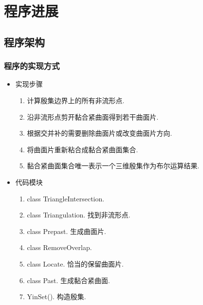 \documentclass[UTF8]{ctexbeamer}	%
\theoremstyle{plain}
\theoremstyle{definition}
\theoremstyle{remark}
\numberwithin{equation}{section}
\begin{document}
\section{程序进展}
\subsection{程序架构}
\begin{frame}
    \frametitle{程序的实现方式}
    \begin{itemize}
        \item 实现步骤
    \begin{enumerate}
        \item 计算殷集边界上的所有非流形点.
        \item 沿非流形点剪开黏合紧曲面得到若干曲面片.
        \item 根据交并补的需要删除曲面片或改变曲面片方向.
        \item 将曲面片重新粘合成黏合紧曲面集合.
        \item 黏合紧曲面集合唯一表示一个三维殷集作为布尔运算结果.
    \end{enumerate}

        \item 代码模块
        \begin{enumerate}
            \item class TriangleIntersection.
            \item class Triangulation. 找到非流形点.
            \item class Prepast. 生成曲面片.
            \item class RemoveOverlap.
            \item class Locate. 恰当的保留曲面片.
            \item class Past. 生成黏合紧曲面.
            \item YinSet(). 构造殷集.
        \end{enumerate}
    \end{itemize}
\end{frame}
\end{document}
